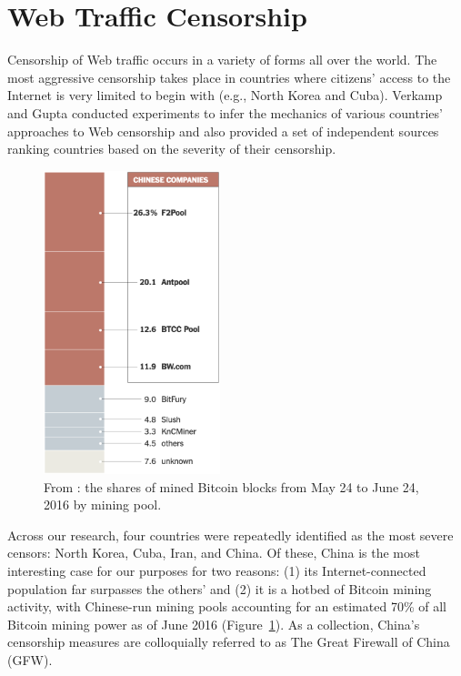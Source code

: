 \section{Web Traffic Censorship}
Censorship of Web traffic occurs in a variety of forms all over the world. The most aggressive censorship takes place in countries where citizens' access to the Internet is very limited to begin with (e.g., North Korea and Cuba). Verkamp and Gupta \cite{Verkamp2012} conducted experiments to infer the mechanics of various countries' approaches to Web censorship and also provided a set of independent sources ranking countries based on the severity of their censorship. 

\begin{figure}[h]
\centering
\includegraphics[height=250pt]{Images/NYT-Bitcoin-China.png}
\caption{From \cite{Popper2016}: the shares of mined Bitcoin blocks from May 24 to June 24, 2016 by mining pool.}
\label{fig:BTCPools}
\end{figure}

Across our research, four countries were repeatedly identified as the most severe censors: North Korea, Cuba, Iran, and China. Of these, China is the most interesting case for our purposes for two reasons: (1) its Internet-connected population far surpasses the others' and (2) it is a hotbed of Bitcoin mining activity, with Chinese-run mining pools accounting for an estimated 70\% of all Bitcoin mining power as of June 2016 (Figure~\ref{fig:BTCPools}). As a collection, China's censorship measures are colloquially referred to as The Great Firewall of China (GFW).